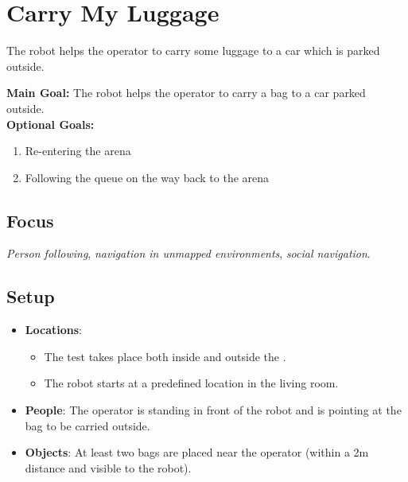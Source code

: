 \section{Carry My Luggage}
\label{test:carry-my-luggage}
The robot helps the operator to carry some luggage to a car which is parked outside.

\noindent \textbf{Main Goal:} The robot helps the operator to carry a bag to a car parked outside.\\

\noindent \textbf{Optional Goals:}
\begin{enumerate}[nosep]
	\item Re-entering the arena
	\item Following the queue on the way back to the arena
\end{enumerate}

\subsection*{Focus}
\emph{Person following}, \emph{navigation in unmapped environments}, \emph{social navigation}.

\subsection*{Setup}
\begin{itemize}[nosep]
	\item \textbf{Locations}: 
		\begin{itemize}
		 \item The test takes place both inside and outside the \Arena{}.
		 \item The robot starts at a predefined location in the living room.
		\end{itemize}
	\item \textbf{People}: The operator is standing in front of the robot and is pointing at the bag to be carried outside.
	\item \textbf{Objects}: At least two bags are placed near the operator (within a 2m distance and visible to the robot).
\end{itemize}

